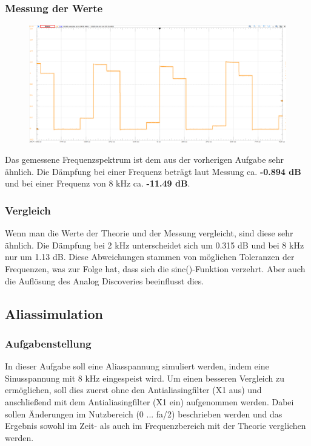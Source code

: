 \documentclass{article}
\begin{document}
\subsubsection{Messung der Werte}
\begin{figure}[h]
    \centering
    \includegraphics[width=0.7\linewidth]{img/Signal_09.png}
\end{figure}
Das gemessene Frequenzspektrum ist dem aus der vorherigen Aufgabe sehr ähnlich. Die Dämpfung bei einer Frequenz beträgt laut Messung ca. \textbf{-0.894 dB} und bei einer Frequenz von 8 kHz ca. \textbf{-11.49 dB}.

\subsubsection{Vergleich}
Wenn man die Werte der Theorie und der Messung vergleicht, sind diese sehr ähnlich. Die Dämpfung bei 2 kHz unterscheidet sich um 0.315 dB und bei 8 kHz nur um 1.13 dB. Diese Abweichungen stammen von möglichen Toleranzen der Frequenzen, was zur Folge hat, dass sich die sinc()-Funktion verzehrt. Aber auch die Auflösung des Analog Discoveries beeinflusst dies.
\newpage
\subsection{Aliassimulation}
\subsubsection{Aufgabenstellung}
In dieser Aufgabe soll eine Aliasspannung simuliert werden, indem eine Sinusspannung mit 8 kHz eingespeist wird. Um einen besseren Vergleich zu ermöglichen, soll dies zuerst ohne den Antialiasingfilter (X1 aus) und anschließend mit dem Antialiasingfilter (X1 ein) aufgenommen werden. Dabei sollen Änderungen im Nutzbereich (0 ... fa/2) beschrieben werden und das Ergebnis sowohl im Zeit- als auch im Frequenzbereich mit der Theorie verglichen werden.
\end{document}
